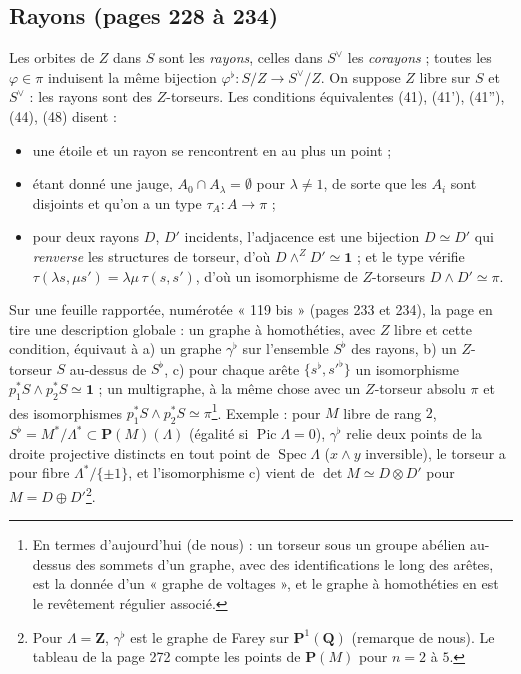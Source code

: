 \documentclass[11pt,a4paper]{article}
\begin{document}
\subsection*{Rayons (pages 228 à 234)}

Les orbites de $Z$ dans $S$ sont les \emph{rayons}, celles dans $S^{\vee}$ les
\emph{corayons} ; toutes les $\varphi \in \pi$ induisent la même bijection
$\varphi^\flat : S/Z \to S^{\vee}/Z$. On suppose $Z$ libre sur $S$ et
$S^{\vee}$ : les rayons sont des $Z$-torseurs. Les conditions équivalentes
(41), (41'), (41''), (44), (48) disent :
\begin{itemize}
  \item une étoile et un rayon se rencontrent en au plus un point ;
  \item étant donné une jauge, $A_0 \cap A_\lambda = \emptyset$ pour $\lambda
    \neq 1$, de sorte que les $A_i$ sont disjoints et qu'on a un type $\tau_A :
    A \to \pi$ ;
  \item pour deux rayons $D$, $D'$ incidents, l'adjacence est une bijection $D
    \simeq D'$ qui \emph{renverse} les structures de torseur, d'où $D
    \wedge^{Z} D' \simeq \mathbf{1}$ ; et le type vérifie $\tau(\lambda s, \mu s')
    = \lambda\mu\,\tau(s, s')$, d'où un isomorphisme de $Z$-torseurs $D \wedge D'
    \simeq \pi$.
\end{itemize}
Sur une feuille rapportée, numérotée « 119 bis » (pages 233 et 234), la page en
tire une description globale : un graphe à homothéties, avec $Z$ libre et cette
condition, équivaut à a) un graphe $\gamma^\flat$ sur l'ensemble $S^\flat$ des
rayons, b) un $Z$-torseur $S$ au-dessus de $S^\flat$, c) pour chaque arête
$\{s^\flat, s'^\flat\}$ un isomorphisme $p_1^{*}S \wedge p_2^{*}S \simeq
\mathbf{1}$ ; un multigraphe, à la même chose avec un $Z$-torseur absolu $\pi$
et des isomorphismes $p_1^{*}S \wedge p_2^{*}S \simeq \pi$\footnote{En termes
d'aujourd'hui (de nous) : un torseur sous un groupe abélien au-dessus des sommets
d'un graphe, avec des identifications le long des arêtes, est la donnée d'un
« graphe de voltages », et le graphe à homothéties en est le revêtement
régulier associé.}. Exemple : pour $M$ libre de rang $2$, $S^\flat = M^{*}/\Lambda^{*}
\subset \mathbf{P}(M)(\Lambda)$ (égalité si $\operatorname{Pic}\Lambda = 0$),
$\gamma^\flat$ relie deux points de la droite projective distincts en tout point
de $\operatorname{Spec}\Lambda$ ($x \wedge y$ inversible), le torseur a pour
fibre $\Lambda^{*}/\{\pm 1\}$, et l'isomorphisme c) vient de $\det M \simeq D
\otimes D'$ pour $M = D \oplus D'$\footnote{Pour $\Lambda = \mathbf{Z}$,
$\gamma^\flat$ est le graphe de Farey sur $\mathbf{P}^1(\mathbf{Q})$ (remarque de
nous). Le tableau de la page 272 compte les points de $\mathbf{P}(M)$ pour $n =
2$ à $5$.}.
\end{document}
